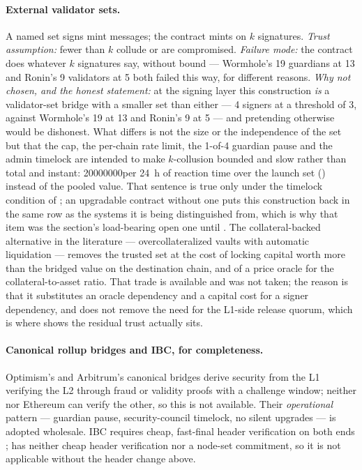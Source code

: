 \paragraph{External validator sets.} A named set signs mint messages; the contract mints on
$k$ signatures. \emph{Trust assumption:} fewer than $k$ collude or are compromised.
\emph{Failure mode:} the contract does whatever $k$ signatures say, without bound --- Wormhole's 19
guardians at 13 and Ronin's 9 validators at 5 both failed this way, for different reasons.
\emph{Why not chosen, and the honest statement:} at the signing layer this construction \emph{is} a
validator-set bridge with a smaller set than either --- 4 signers at a threshold of 3, against
Wormhole's 19 at 13 and Ronin's 9 at 5 --- and pretending otherwise would be dishonest. What differs
is not the size or the independence of the set but that the cap, the per-chain rate limit, the
1-of-4 guardian pause and the admin timelock are intended to make $k$-collusion bounded and slow
rather than total and instant: \num{20000000}\flux per \SI{24}{\hour} of reaction time over the
launch set () instead of the pooled value. That sentence is true only under
the timelock condition of ; an upgradable contract without one puts this
construction back in the same row as the systems it is being distinguished from, which is why that
item was the section's load-bearing open one until . The
collateral-backed alternative in the literature --- overcollateralized vaults with automatic
liquidation \citep{zamyatin2019xclaim} --- removes the trusted set at the cost of locking capital
worth more than the bridged value on the destination chain, and of a price oracle for the
collateral-to-asset ratio. That trade is available and was not taken; the reason is that it
substitutes an oracle dependency and a capital cost for a signer dependency, and does not remove the
need for the L1-side release quorum, which is where  shows the residual
trust actually sits.

\paragraph{Canonical rollup bridges and IBC, for completeness.} Optimism's and Arbitrum's canonical
bridges derive security from the L1 verifying the L2 through fraud or validity proofs with a
challenge window; neither \Flux nor Ethereum can verify the other, so this is not available.
Their \emph{operational} pattern --- guardian pause, security-council timelock, no silent upgrades
--- is adopted wholesale. IBC requires cheap, fast-final header verification on both ends
\citep{cosmosibc}; \Flux has neither cheap header verification nor a node-set commitment, so it is
not applicable without the header change above.

